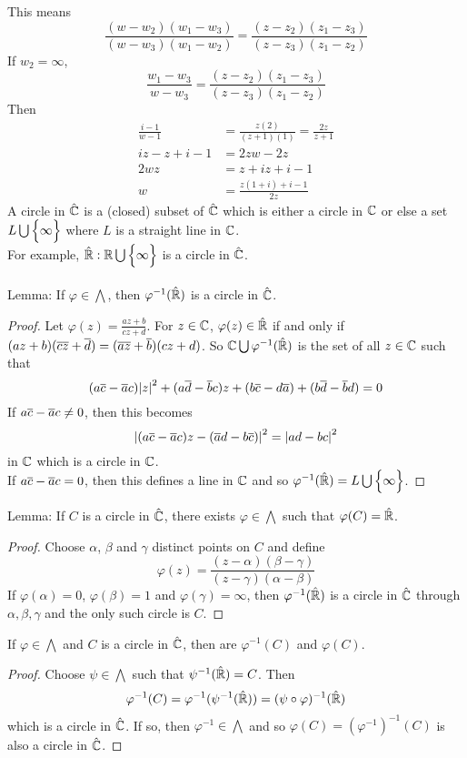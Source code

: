 \documentclass[12pt]{article}
\begin{document}
This means $$ \frac{(w-w_2)(w_1-w_3)}{(w-w_3)(w_1-w_2)} = \frac{(z-z_2)(z_1-z_3)}{(z-z_3)(z_1-z_2)} $$
If $w_2 = \infty$, $$ \frac{w_1-w_3}{w-w_3} = \frac{(z-z_2)(z_1-z_3)}{(z-z_3)(z_1-z_2)} $$ 
Then $$ \begin{aligned} \frac{i-1}{w-1} &= \frac{z(2)}{(z+1)(1)} = \frac{2z}{z+1} \\ iz-z+i-1 &= 2zw-2z \\ 2wz &= z + iz + i - 1 \\ w &= \frac{z(1+i) + i - 1}{2z} \end{aligned} $$ 
A circle in $\hat{\mathbb{C}}$ is a (closed) subset of $\hat{\mathbb{C}}$ which is either a circle in $\mathbb{C}$ or else a set $L \bigcup \Big\{ \infty \Big\}$ where $L$ is a straight line in $\mathbb{C}$. \\
For example, $\hat{\mathbb{R}}: \mathbb{R} \bigcup \Big\{ \infty \Big\}$ is a circle in $\hat{\mathbb{C}}$. \\~\\
Lemma: If $\varphi \in \bigwedge$, then $\varphi^{-1}(\hat{\mathbb{R}})$ is a circle in $\hat{\mathbb{C}}$. 
\begin{proof} Let $\varphi(z) = \frac{az+b}{cz+d}$. For $z \in \mathbb{C}$, $\varphi(z) \in \hat{\mathbb{R}}$ if and only if $(az+b)(\overline{c}\overline{z} + \overline{d}) = (\overline{a}\overline{z} + \overline{b})(cz+d)$. So $\mathbb{C} \bigcup \varphi^{-1}(\hat{\mathbb{R}})$ is the set of all $z \in \mathbb{C}$ such that $$ (a\overline{c} - \overline{a}c)\abs{z}^2 + (a\overline{d} - \overline{b}c)z + (b\overline{c} - d\overline{a}) + (b\overline{d} - \overline{b}d) = 0 $$ 
If $a\overline{c} - \overline{a}c \neq 0$, then this becomes $$ \abs{(a\overline{c} - \overline{a}c)z - (\overline{a}d - b\overline{c})}^2 = \abs{ad - bc}^2 $$ in $\mathbb{C}$ which is a circle in $\mathbb{C}$. \\
If $a\overline{c} - \overline{a}c = 0$, then this defines a line in $\mathbb{C}$ and so $\varphi^{-1}(\hat{\mathbb{R}}) = L \bigcup \Big\{ \infty \Big\}$. \end{proof}
Lemma: If $C$ is a circle in $\hat{\mathbb{C}}$, there exists $\varphi \in \bigwedge$ such that $\varphi(C) = \hat{\mathbb{R}}$. 
\begin{proof} Choose $\alpha$, $\beta$ and $\gamma$ distinct points on $C$ and define $$ \varphi(z) = \frac{(z-\alpha)(\beta-\gamma)}{(z-\gamma)(\alpha-\beta)}$$ If $\varphi(\alpha) = 0$, $\varphi(\beta) = 1$ and $\varphi(\gamma) = \infty$, then $\varphi^{-1}(\hat{\mathbb{R}})$ is a circle in $\hat{\mathbb{C}}$ through $\alpha,\beta,\gamma$ and the only such circle is $C$. \end{proof} 
\begin{theorem} If $ \varphi \in \bigwedge$ and $C$ is a circle in $\hat{\mathbb{C}}$, then are $\varphi^{-1}(C)$ and $\varphi(C)$. \end{theorem} 
\begin{proof} Choose $\psi \in \bigwedge$ such that $\psi^{-1}(\hat{\mathbb{R}}) = C$. Then 
$$\varphi^{-1}(C) = \varphi^{-1}(\psi^{-1}(\hat{\mathbb{R}})) = (\psi \circ \varphi)^{-1}(\hat{\mathbb{R}})$$ which is a circle in $\hat{\mathbb{C}}$. If so, then $\varphi^{-1} \in \bigwedge$ and so $\varphi(C) = (\varphi^{-1})^{-1}(C)$ is also a circle in $\hat{\mathbb{C}}$. \end{proof}
\end{document}
